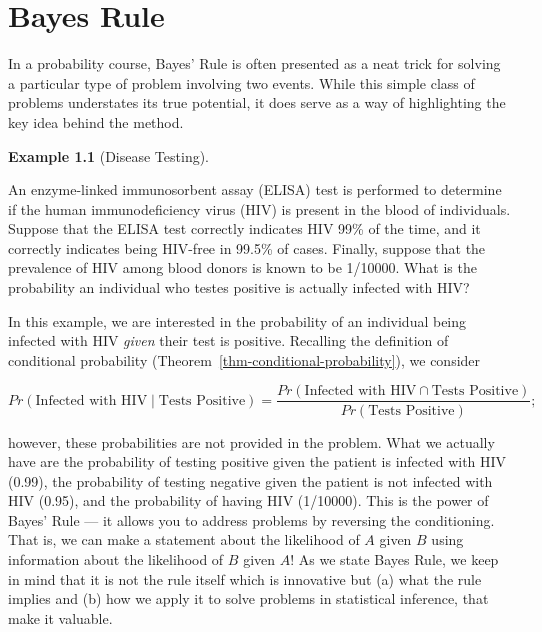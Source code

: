 \documentclass[
  letterpaper,
  DIV=11,
  numbers=noendperiod]{scrreprt}
\theoremstyle{definition}
\theoremstyle{plain}
\theoremstyle{definition}
\newtheorem{example}{Example}[chapter]
\theoremstyle{remark}
\begin{document}
\hypertarget{sec-bayesrule}{%
\chapter{Bayes Rule}\label{sec-bayesrule}}

\providecommand{\norm}[1]{\lVert#1\rVert}
\providecommand{\abs}[1]{\lvert#1\rvert}
\providecommand{\iid}{\stackrel{\text{IID}}{\sim}}
\providecommand{\ind}{\stackrel{\text{Ind}}{\sim}}

\providecommand{\bm}[1]{\mathbf{#1}}
\providecommand{\bs}[1]{\boldsymbol{#1}}
\providecommand{\bbeta}{\bs{\beta}}

\providecommand{\Ell}{\mathcal{L}}
\providecommand{\indep}{\perp\negthickspace\negmedspace\perp}

In a probability course, Bayes' Rule is often presented as a neat trick
for solving a particular type of problem involving two events. While
this simple class of problems understates its true potential, it does
serve as a way of highlighting the key idea behind the method.

\begin{example}[Disease
Testing]\protect\hypertarget{exm-disease}{}\label{exm-disease}

An enzyme-linked immunosorbent assay (ELISA) test is performed to
determine if the human immunodeficiency virus (HIV) is present in the
blood of individuals. Suppose that the ELISA test correctly indicates
HIV 99\% of the time, and it correctly indicates being HIV-free in
99.5\% of cases. Finally, suppose that the prevalence of HIV among blood
donors is known to be 1/10000. What is the probability an individual who
testes positive is actually infected with HIV?

\end{example}

In this example, we are interested in the probability of an individual
being infected with HIV \emph{given} their test is positive. Recalling
the definition of conditional probability
(Theorem~\ref{thm-conditional-probability}), we consider

\[Pr(\text{Infected with HIV} \mid \text{Tests Positive}) = \frac{Pr(\text{Infected with HIV} \cap \text{Tests Positive})}{Pr(\text{Tests Positive})};\]

however, these probabilities are not provided in the problem. What we
actually have are the probability of testing positive given the patient
is infected with HIV (0.99), the probability of testing negative given
the patient is not infected with HIV (0.95), and the probability of
having HIV (1/10000). This is the power of Bayes' Rule --- it allows you
to address problems by reversing the conditioning. That is, we can make
a statement about the likelihood of \(A\) given \(B\) using information
about the likelihood of \(B\) given \(A\)! As we state Bayes Rule, we
keep in mind that it is not the rule itself which is innovative but (a)
what the rule implies and (b) how we apply it to solve problems in
statistical inference, that make it valuable.
\end{document}

